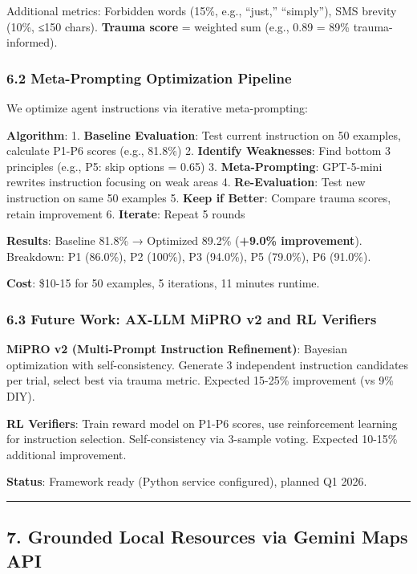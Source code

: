 \documentclass[
]{article}
\begin{document}
Additional metrics: Forbidden words (15\%, e.g., ``just,'' ``simply''),
SMS brevity (10\%, ≤150 chars). \textbf{Trauma score} = weighted sum
(e.g., 0.89 = 89\% trauma-informed).

\subsubsection{6.2 Meta-Prompting Optimization
Pipeline}\label{meta-prompting-optimization-pipeline}

We optimize agent instructions via iterative meta-prompting:

\textbf{Algorithm}: 1. \textbf{Baseline Evaluation}: Test current
instruction on 50 examples, calculate P1-P6 scores (e.g., 81.8\%) 2.
\textbf{Identify Weaknesses}: Find bottom 3 principles (e.g., P5: skip
options = 0.65) 3. \textbf{Meta-Prompting}: GPT-5-mini rewrites
instruction focusing on weak areas 4. \textbf{Re-Evaluation}: Test new
instruction on same 50 examples 5. \textbf{Keep if Better}: Compare
trauma scores, retain improvement 6. \textbf{Iterate}: Repeat 5 rounds

\textbf{Results}: Baseline 81.8\% → Optimized 89.2\% (\textbf{+9.0\%
improvement}). Breakdown: P1 (86.0\%), P2 (100\%), P3 (94.0\%), P5
(79.0\%), P6 (91.0\%).

\textbf{Cost}: \$10-15 for 50 examples, 5 iterations, 11 minutes
runtime.

\subsubsection{6.3 Future Work: AX-LLM MiPRO v2 and RL
Verifiers}\label{future-work-ax-llm-mipro-v2-and-rl-verifiers}

\textbf{MiPRO v2 (Multi-Prompt Instruction Refinement)}: Bayesian
optimization with self-consistency. Generate 3 independent instruction
candidates per trial, select best via trauma metric. Expected 15-25\%
improvement (vs 9\% DIY).

\textbf{RL Verifiers}: Train reward model on P1-P6 scores, use
reinforcement learning for instruction selection. Self-consistency via
3-sample voting. Expected 10-15\% additional improvement.

\textbf{Status}: Framework ready (Python service configured), planned Q1
2026.

\begin{center}\rule{0.5\linewidth}{0.5pt}\end{center}

\subsection{7. Grounded Local Resources via Gemini Maps
API}\label{grounded-local-resources-via-gemini-maps-api}
\end{document}

